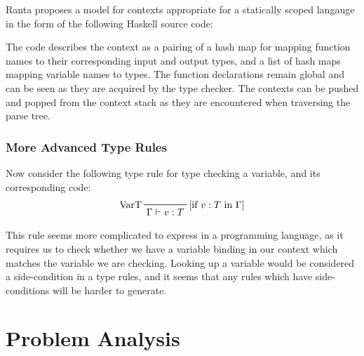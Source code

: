 \documentclass{UoYCSproject}
\begin{document}
Ranta \cite{Ranta} proposes a model for contexts appropriate for a statically
scoped langauge in the form of the following Haskell source code:

The code describes the context as a pairing of a hash map for mapping function
names to their corresponding input and output types, and a list of hash maps
mapping variable names to types. The function declarations remain global and can
be seen as they are acquired by the type checker. The contexts can be pushed
and popped from the context stack as they are encountered when traversing the
parse tree.

\subsection{More Advanced Type Rules}
Now consider the following type rule for type checking a variable, and its
corresponding code:
\begin{displaymath}
    \prftree[l,r]{[if $v:T$ in $\Gamma$]}{VarT}{\Gamma \vdash v:T}
\end{displaymath}


This rule seems more complicated to express in a programming language, as it
requires us to check whether we have a variable binding in our context which
matches the variable we are checking. Looking up a variable would be considered
a side-condition in a type rules, and it seems that any rules which have
side-conditions will be harder to generate.

\chapter{Problem Analysis}
\end{document}
